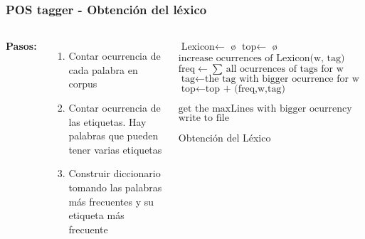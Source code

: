 \documentclass{beamer}
\begin{document}
\begin{frame}[fragile]
\frametitle{POS tagger - Obtención del léxico}
\begin{columns}[t] %
\textbf{Pasos:}
\begin{enumerate}
\item Contar ocurrencia de cada palabra en corpus
\item Contar ocurrencia de las etiquetas. Hay palabras que
pueden tener varias etiquetas
\item Construir diccionario tomando las palabras más frecuentes y su etiqueta más frecuente
\end{enumerate}
\begin{algorithm}[H]
    \begin{algorithmic}[1]
    \algrenewcommand{}
    \State $\text{Lexicon} \gets$ \o
    \State $\text{top} \gets$ \o
            \State $\text{increase ocurrences of Lexicon(w, tag)} $
            \EndFor
    \EndFor        
            \State $\text{freq} \gets \text{$\sum$ all ocurrences of tags for w}$
             \State $\text{tag} \gets \text{the tag with bigger ocurrence for w}$
             \State $\text{top} \gets \text{top + (freq,w,tag) }$
            \EndFor
            
     \State $\text{get the maxLines with bigger ocurrency}$ 
     \State $\text{write to file}$      
        \EndProcedure
    \end{algorithmic}
    \label{alg:rAP}
    \caption{Obtención del Léxico}
\end{algorithm}
\end{columns}
\end{frame}
\end{document}
